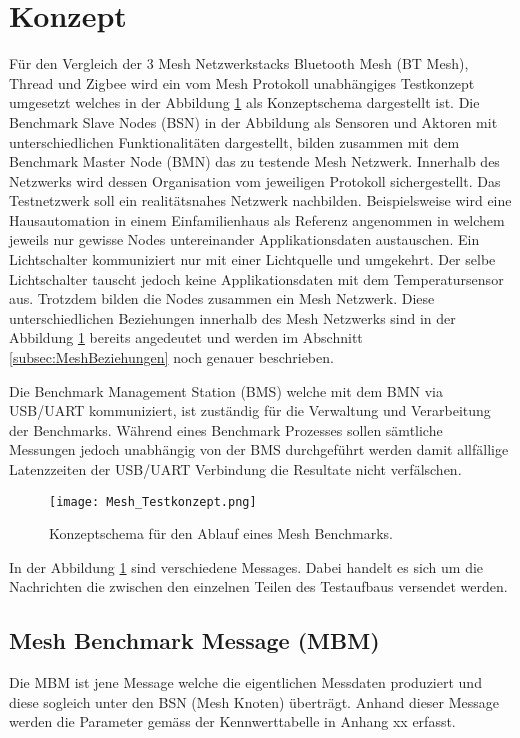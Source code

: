 	\clearpage
\section{Konzept}\label{sec:Konzept}

Für den Vergleich der 3 Mesh Netzwerkstacks Bluetooth Mesh (BT Mesh), Thread und Zigbee wird ein vom Mesh Protokoll unabhängiges Testkonzept umgesetzt welches in der Abbildung \ref{fig:MeshTestKonzept} als Konzeptschema dargestellt ist. Die Benchmark Slave Nodes (BSN) in der Abbildung als Sensoren und Aktoren mit unterschiedlichen Funktionalitäten dargestellt, bilden zusammen mit dem Benchmark Master Node (BMN) das zu testende Mesh Netzwerk. Innerhalb des Netzwerks wird dessen Organisation vom jeweiligen Protokoll sichergestellt. Das Testnetzwerk soll ein realitätsnahes Netzwerk nachbilden. Beispielsweise wird eine Hausautomation in einem Einfamilienhaus als Referenz angenommen in welchem jeweils nur gewisse Nodes untereinander Applikationsdaten austauschen. Ein Lichtschalter kommuniziert nur mit einer Lichtquelle und umgekehrt. Der selbe Lichtschalter tauscht jedoch keine Applikationsdaten mit dem Temperatursensor aus. Trotzdem bilden die Nodes zusammen ein Mesh Netzwerk. Diese unterschiedlichen Beziehungen innerhalb des Mesh Netzwerks sind in der Abbildung \ref{fig:MeshTestKonzept} bereits angedeutet und werden im Abschnitt \ref{subsec:MeshBeziehungen} noch genauer beschrieben.

Die Benchmark Management Station (BMS) welche mit dem BMN via USB/UART kommuniziert, ist zuständig für die Verwaltung und Verarbeitung der Benchmarks. Während eines Benchmark Prozesses sollen sämtliche Messungen jedoch unabhängig von der BMS durchgeführt werden damit allfällige Latenzzeiten der USB/UART Verbindung die Resultate nicht verfälschen.



\begin{figure}[H]
	\centering
	\texttt{[image: Mesh\_Testkonzept.png]}
	\caption{Konzeptschema für den Ablauf eines Mesh Benchmarks.}\label{fig:MeshTestKonzept}
\end{figure}


In der Abbildung \ref{fig:MeshTestKonzept} sind verschiedene Messages. Dabei handelt es sich um die Nachrichten die zwischen den einzelnen Teilen des Testaufbaus versendet werden. 

\subsection{Mesh Benchmark Message (MBM)}\label{subsec:MeshBenchmarkMessage}
Die MBM ist jene Message welche die eigentlichen Messdaten produziert und diese sogleich unter den BSN (Mesh Knoten) überträgt. Anhand dieser Message werden die Parameter gemäss der Kennwerttabelle in Anhang xx erfasst.

